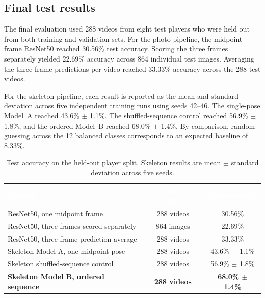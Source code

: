 \documentclass[12pt,a4paper]{article}
\begin{document}
\clearpage
\subsection{Final test results}
The final evaluation used 288 videos from eight test players who were held out from both training and validation sets. For the photo pipeline, the midpoint-frame ResNet50 reached 30.56\% test accuracy. Scoring the three frames separately yielded 22.69\% accuracy across 864 individual test images. Averaging the three frame predictions per video reached 33.33\% accuracy across the 288 test videos.

For the skeleton pipeline, each result is reported as the mean and standard deviation across five independent training runs using seeds 42--46. The single-pose Model~A reached 43.6\% $\pm$ 1.1\%. The shuffled-sequence control reached 56.9\% $\pm$ 1.8\%, and the ordered Model~B reached 68.0\% $\pm$ 1.4\%. By comparison, random guessing across the 12 balanced classes corresponds to an expected baseline of 8.33\%.

\vspace{0.8em}
\begin{table}[H]
\centering
\small
\setlength{\tabcolsep}{8pt}
\renewcommand{\arraystretch}{1.22}
\caption{Test accuracy on the held-out player split. Skeleton results are mean $\pm$ standard deviation across five seeds.}
\label{tab:test}
\begin{tabular}{lcc}
\toprule
\rowcolor{tablehead}
\textcolor{white}{\textbf{Method}} & \textcolor{white}{\textbf{Evaluation unit}} & \textcolor{white}{\textbf{Test accuracy}} \\
\midrule
\rowcolor{tablerowlight}
ResNet50, one midpoint frame & 288 videos & 30.56\% \\
ResNet50, three frames scored separately & 864 images & 22.69\% \\
\rowcolor{tablerowlight}
ResNet50, three-frame prediction average & 288 videos & 33.33\% \\
Skeleton Model A, one midpoint pose & 288 videos & 43.6\% $\pm$ 1.1\% \\
\rowcolor{tablerowlight}
Skeleton shuffled-sequence control & 288 videos & 56.9\% $\pm$ 1.8\% \\
\rowcolor{tablehighlight}
\textbf{Skeleton Model B, ordered sequence} & \textbf{288 videos} & \textbf{68.0\% $\pm$ 1.4\%} \\
\bottomrule
\end{tabular}
\end{table}
\end{document}
